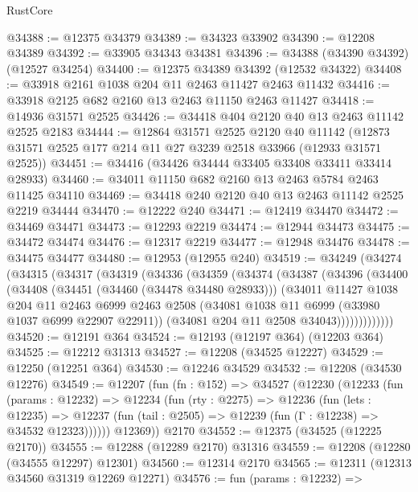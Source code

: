 \begin{lexlean}{RustCore}
\begin{coremodule}
@34388 := @12375 @34379
@34389 := @34323 @33902
@34390 := @12208 @34389
@34392 := @33905 @34343 @34381
@34396 := @34388 (@34390 @34392) (@12527 @34254)
@34400 := @12375 @34389 @34392 (@12532 @34322)
@34408 := @33918 @2161 @1038 @204 @11 @2463 @11427 @2463 @11432
@34416 := @33918 @2125 @682 @2160 @13 @2463 @11150 @2463 @11427
@34418 := @14936 @31571 @2525
@34426 := @34418 @404 @2120 @40 @13 @2463 @11142 @2525 @2183
@34444 := @12864
    @31571
    @2525
    @2120
    @40
    @11142
    (@12873 @31571 @2525 @177 @214 @11 @27 @3239 @2518 @33966 (@12933 @31571 @2525))
@34451 := @34416 (@34426 @34444 @33405 @33408 @33411 @33414 @28933)
@34460 := @34011 @11150 @682 @2160 @13 @2463 @5784 @2463 @11425 @34110
@34469 := @34418 @240 @2120 @40 @13 @2463 @11142 @2525 @2219 @34444
@34470 := @12222 @240
@34471 := @12419 @34470
@34472 := @34469 @34471
@34473 := @12293 @2219
@34474 := @12944 @34473
@34475 := @34472 @34474
@34476 := @12317 @2219
@34477 := @12948 @34476
@34478 := @34475 @34477
@34480 := @12953 (@12955 @240)
@34519 := @34249
    (@34274
      (@34315
        (@34317
          (@34319
            (@34336
              (@34359
                (@34374
                  (@34387
                    (@34396
                      (@34400
                        (@34408
                          (@34451 (@34460 (@34478 @34480 @28933)))
                          (@34011
                            @11427
                            @1038
                            @204
                            @11
                            @2463
                            @6999
                            @2463
                            @2508
                            (@34081 @1038 @11 @6999 (@33980 @1037 @6999 @22907 @22911))
                            (@34081 @204 @11 @2508 @34043)))))))))))))
@34520 := @12191 @364
@34524 := @12193 (@12197 @364) (@12203 @364)
@34525 := @12212 @31313
@34527 := @12208 (@34525 @12227)
@34529 := @12250 (@12251 @364)
@34530 := @12246 @34529
@34532 := @12208 (@34530 @12276)
@34549 := @12207
    (fun (fn : @152) =>
    @34527
      (@12230
        (@12233
          (fun (params : @12232) =>
          @12234
            (fun (rty : @2275) =>
            @12236
              (fun (lets : @12235) =>
              @12237 (fun (tail : @2505) => @12239 (fun (Γ : @12238) => @34532 @12323))))))
        @12369))
    @2170
@34552 := @12375 (@34525 (@12225 @2170))
@34555 := @12288 (@12289 @2170) @31316
@34559 := @12208 (@12280 (@34555 @12297) @12301)
@34560 := @12314 @2170
@34565 := @12311 (@12313 @34560 @31319 @12269 @12271)
@34576 := fun (params : @12232) =>

\end{coremodule}
\end{lexlean}
